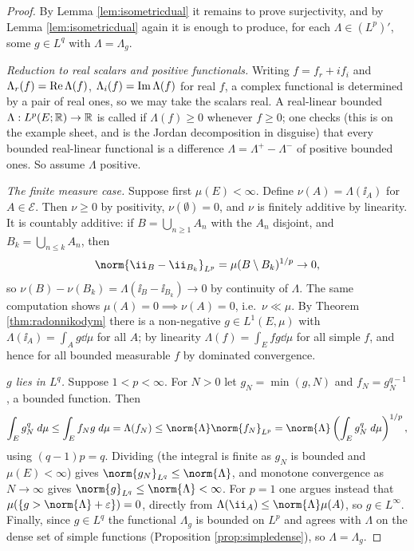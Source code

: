 \documentclass[a4paper]{scrartcl}
\begin{document}
\begin{proof}
	By Lemma \ref{lem:isometricdual} it remains to prove surjectivity, and by Lemma \ref{lem:isometricdual} again it is enough to produce, for each $\Lambda \in (L^p)'$, some $g \in L^q$ with $\Lambda = \Lambda_g$.

	\emph{Reduction to real scalars and positive functionals.} Writing $f = f_r + i f_i$ and $\Lambda_r(f) = \operatorname{Re} \Lambda(f)$, $\Lambda_i(f) = \operatorname{Im} \Lambda(f)$ for real $f$, a complex functional is determined by a pair of real ones, so we may take the scalars real. A real-linear bounded $\Lambda : L^p(E;\mathbb{R}) \to \mathbb{R}$ is called  if $\Lambda(f) \ge 0$ whenever $f \ge 0$; one checks (this is on the example sheet, and is the Jordan decomposition in disguise) that every bounded real-linear functional is a difference $\Lambda = \Lambda^+ - \Lambda^-$ of positive bounded ones. So assume $\Lambda$ positive.

	\emph{The finite measure case.} Suppose first $\mu(E) < \infty$. Define $\nu(A) = \Lambda(\ii_A)$ for $A \in \mathcal{E}$. Then $\nu \ge 0$ by positivity, $\nu(\emptyset) = 0$, and $\nu$ is finitely additive by linearity. It is countably additive: if $B = \bigcup_{n \ge 1} A_n$ with the $A_n$ disjoint, and $B_k = \bigcup_{n \le k}A_n$, then
	$$\norm{\ii_B - \ii_{B_k}}_{L^p} = \mu(B \setminus B_k)^{1/p} \to 0,$$
	so $\nu(B) - \nu(B_k) = \Lambda(\ii_{B} - \ii_{B_k}) \to 0$ by continuity of $\Lambda$. The same computation shows $\mu(A) = 0 \implies \nu(A) = 0$, i.e.\ $\nu \ll \mu$. By Theorem \ref{thm:radonnikodym} there is a non-negative $g \in L^1(E,\mu)$ with $\Lambda(\ii_A) = \int_A g \dd\mu$ for all $A$; by linearity $\Lambda(f) = \int_E fg \dd\mu$ for all simple $f$, and hence for all bounded measurable $f$ by dominated convergence.

	\emph{$g$ lies in $L^q$.} Suppose $1 < p < \infty$. For $N > 0$ let $g_N = \min(g, N)$ and $f_N = g_N^{q-1}$, a bounded function. Then
	$$\int_E g_N^{q} \dd\mu \le \int_E f_N g \dd\mu = \Lambda(f_N) \le \norm{\Lambda} \norm{f_N}_{L^p} = \norm{\Lambda}\left( \int_E g_N^{q}\dd\mu\right)^{1/p},$$
	using $(q-1)p = q$. Dividing (the integral is finite as $g_N$ is bounded and $\mu(E) < \infty$) gives $\norm{g_N}_{L^q} \le \norm{\Lambda}$, and monotone convergence as $N \to \infty$ gives $\norm{g}_{L^q}\le \norm{\Lambda} < \infty$. For $p = 1$ one argues instead that $\mu(\{g > \norm{\Lambda}+\varepsilon\}) = 0$, directly from $\Lambda(\ii_A) \le \norm{\Lambda}\mu(A)$, so $g \in L^\infty$. Finally, since $g \in L^q$ the functional $\Lambda_g$ is bounded on $L^p$ and agrees with $\Lambda$ on the dense set of simple functions (Proposition \ref{prop:simpledense}), so $\Lambda = \Lambda_g$.


\end{proof}
\end{document}
